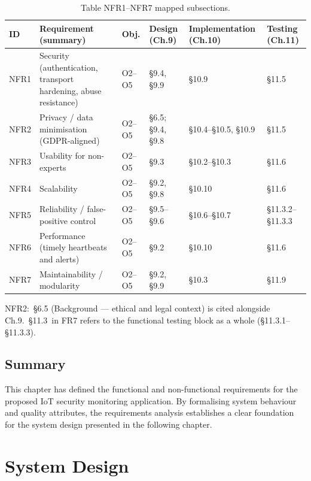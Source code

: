 \begin{table}[htbp]
  \centering
  \small
  \caption{Table  NFR1--NFR7 mapped subsections.}
  \label{tab:ica1_6}
\begin{tabular}{p{}p{}p{}p{}p{}p{}}
\toprule
ID & Requirement (summary) & Obj. & Design (Ch.9) & Implementation (Ch.10) & Testing (Ch.11) \\
\midrule
NFR1 & Security (authentication, transport hardening, abuse resistance) & O2--O5 & \S{}9.4, \S{}9.9 & \S{}10.9 & \S{}11.5 \\
NFR2 & Privacy / data minimisation (GDPR-aligned) & O2--O5 & \S{}6.5; \S{}9.4, \S{}9.8 & \S{}10.4--\S{}10.5, \S{}10.9 & \S{}11.5 \\
NFR3 & Usability for non-experts & O2--O5 & \S{}9.3 & \S{}10.2--\S{}10.3 & \S{}11.6 \\
NFR4 & Scalability & O2--O5 & \S{}9.2, \S{}9.8 & \S{}10.10 & \S{}11.6 \\
NFR5 & Reliability / false-positive control & O2--O5 & \S{}9.5--\S{}9.6 & \S{}10.6--\S{}10.7 & \S{}11.3.2--\S{}11.3.3 \\
NFR6 & Performance (timely heartbeats and alerts) & O2--O5 & \S{}9.2 & \S{}10.10 & \S{}11.6 \\
NFR7 & Maintainability / modularity & O2--O5 & \S{}9.2, \S{}9.9 & \S{}10.3 & \S{}11.9 \\
\bottomrule
\end{tabular}
\end{table}

NFR2:~\S{}6.5 (Background --- ethical and legal context) is cited alongside Ch.9.~\S{}11.3~in FR7 refers to the functional testing block as a whole (\S{}11.3.1--\S{}11.3.3).

\section{Summary}

This chapter has defined the functional and non-functional requirements for the proposed IoT security monitoring application. By formalising system behaviour and quality attributes, the requirements analysis establishes a clear foundation for the system design presented in the following chapter.

\chapter{System Design}

